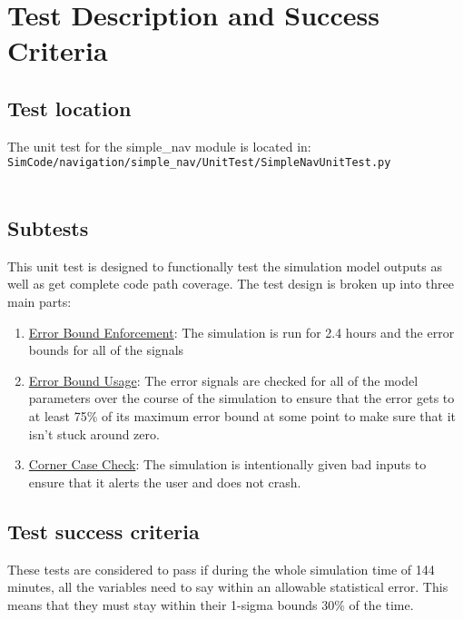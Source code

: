 \section{Test Description and Success Criteria}


\subsection{Test location}

The unit test for the simple\_nav module is located in:\\

\noindent
{\tt SimCode/navigation/simple\_nav/UnitTest/SimpleNavUnitTest.py} \\
\\

\subsection{Subtests}

\noindent This unit test is designed to functionally test the simulation model 
outputs as well as get complete code path coverage.  The test design is broken 
up into three main parts:\\
\begin{enumerate}
\item{\underline{Error Bound Enforcement}: The simulation is run for 2.4 hours and the 
   error bounds for all of the signals }
\item{\underline{Error Bound Usage}: The error signals are checked for all of the model 
   parameters over the course of the simulation to ensure that the error gets 
   to at least 75\% of its maximum error bound at some point to make sure that 
   it isn't stuck around zero.}
\item{\underline{Corner Case Check}: The simulation is intentionally given bad inputs to 
   ensure that it alerts the user and does not crash.}
\end{enumerate}

\subsection{Test success criteria}

These tests are considered to pass if during the whole simulation time of 144 minutes,
all the variables need to say within an allowable statistical error. This means that they
must stay within their 1-sigma bounds $30\%$ of the time.

